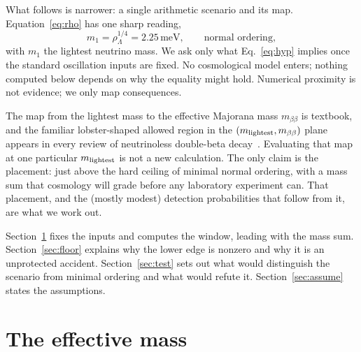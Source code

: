 \documentclass[aps,prd,twocolumn,superscriptaddress,nofootinbib,10pt]{revtex4-2}
\begin{document}
What follows is narrower: a single arithmetic scenario and its map. Equation~\eqref{eq:rho} has one
sharp reading,
%
\begin{equation}
  m_1 = \rho_\Lambda^{1/4} = 2.25\,\mathrm{meV}, \qquad \text{normal ordering},
  \label{eq:hyp}
\end{equation}
%
with $m_1$ the lightest neutrino mass. We ask only what Eq.~\eqref{eq:hyp} implies once the
standard oscillation inputs are fixed. No cosmological model enters; nothing computed below
depends on why the equality might hold. Numerical proximity is not evidence; we only map
consequences.

The map from the lightest mass to the effective Majorana mass $m_{\beta\beta}$ is textbook, and the
familiar lobster-shaped allowed region in the $(m_{\rm lightest}, m_{\beta\beta})$ plane appears in
every review of neutrinoless double-beta decay~\cite{DellOroReview2016,AgostiniReview2023}.
Evaluating that map at one particular $m_{\rm lightest}$ is not a new calculation. The only claim is
the placement: just above the hard ceiling of minimal normal ordering, with a mass sum that
cosmology will grade before any laboratory experiment can. That placement, and the (mostly modest)
detection probabilities that follow from it, are what we work out.

Section~\ref{sec:calc} fixes the inputs and computes the window, leading with the mass sum.
Section~\ref{sec:floor} explains why the lower edge is nonzero and why it is an unprotected
accident. Section~\ref{sec:test} sets out what would distinguish the scenario from minimal
ordering and what would refute it. Section~\ref{sec:assume} states the assumptions.

\section{The effective mass}\label{sec:calc}
\end{document}
